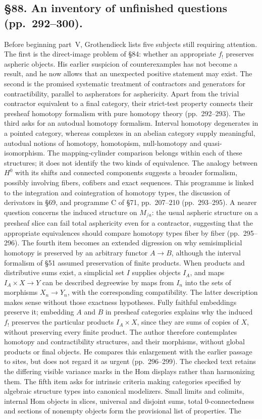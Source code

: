 \documentclass[10pt,oneside]{book}
\begin{document}
\subsection*{\S88. An inventory of unfinished questions (pp.\ 292--300).}
Before beginning part~V, Grothendieck lists five subjects still requiring attention. The first is the direct-image problem of \S84: whether an appropriate $f_!$ preserves aspheric objects. His earlier suspicion of counterexamples has not become a result, and he now allows that an unexpected positive statement may exist. The second is the promised systematic treatment of contractors and generators for contractibility, parallel to aspherators for asphericity. Apart from the trivial contractor equivalent to a final category, their strict-test property connects their presheaf homotopy formalism with pure homotopy theory (pp.\ 292--293). The third asks for an autodual homotopy formalism. Interval homotopy degenerates in a pointed category, whereas complexes in an abelian category supply meaningful, autodual notions of homotopy, homotopism, null-homotopy and quasi-isomorphism. The mapping-cylinder comparison belongs within each of these structures; it does not identify the two kinds of equivalence. The analogy between $H^0$ with its shifts and connected components suggests a broader formalism, possibly involving fibers, cofibers and exact sequences. This programme is linked to the integration and cointegration of homotopy types, the discussion of derivators in \S69, and programme C of \S71, pp.\ 207--210 (pp.\ 293--295). A nearer question concerns the induced structure on $M_{/a}$: the usual aspheric structure on a presheaf slice can fail total asphericity even for a contractor, suggesting that the appropriate equivalences should compare homotopy types fiber by fiber (pp.\ 295--296). The fourth item becomes an extended digression on why semisimplicial homotopy is preserved by an arbitrary functor $A\to B$, although the interval formalism of \S51 assumed preservation of finite products. When products and distributive sums exist, a simplicial set $I$ supplies objects $I_A$, and maps $I_A\times X\to Y$ can be described degreewise by maps from $I_n$ into the sets of morphisms $X_n\to Y_n$, with the corresponding compatibility. The latter description makes sense without those exactness hypotheses. Fully faithful embeddings preserve it; embedding $A$ and $B$ in presheaf categories explains why the induced $f_!$ preserves the particular products $I_A\times X$, since they are sums of copies of $X$, without preserving every finite product. The author therefore contemplates homotopy and contractibility structures, and their morphisms, without global products or final objects. He compares this enlargement with the earlier passage to sites, but does not regard it as urgent (pp.\ 296--299). The checked text retains the differing visible variance marks in the Hom displays rather than harmonizing them. The fifth item asks for intrinsic criteria making categories specified by algebraic structure types into canonical modelizers. Small limits and colimits, internal Hom objects in slices, universal and disjoint sums, total 0-connectedness and sections of nonempty objects form the provisional list of properties. The 
\end{document}
